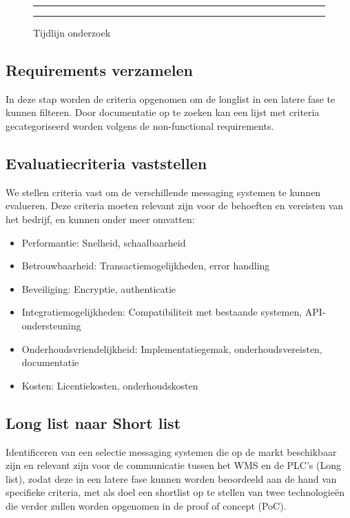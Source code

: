 \begin{figure}[htbp]
  \centering  
  \rule{\linewidth}{1pt}
  \rule{\linewidth}{1pt}
  \caption{Tijdlijn onderzoek}
  \label{fig:timeline}
\end{figure}

 
\subsection{Requirements verzamelen}
In deze stap worden de criteria opgenomen om de longlist in een latere fase te kunnen filteren.
Door documentatie op te zoeken kan een lijst met criteria gecategoriseerd worden volgens de non-functional requirements.

\subsection{Evaluatiecriteria vaststellen}
We stellen criteria vast om de verschillende messaging systemen te kunnen evalueren. 
Deze criteria moeten relevant zijn voor de behoeften en vereisten van het bedrijf, en kunnen onder meer omvatten:
\begin{itemize}
  \item Performantie: Snelheid, schaalbaarheid
  \item Betrouwbaarheid: Transactiemogelijkheden, error handling
  \item Beveiliging: Encryptie, authenticatie
  \item Integratiemogelijkheden: Compatibiliteit \newline met bestaande systemen, API-ondersteuning
  \item Onderhoudsvriendelijkheid: Implementatiegemak, onderhoudsvereisten, documentatie
  \item Kosten: Licentiekosten, onderhoudskosten
\end{itemize}

\subsection{Long list naar Short list}
Identificeren van een selectie messaging systemen die op de markt beschikbaar zijn en relevant zijn voor de communicatie tussen 
het WMS en de PLC's (Long list), zodat deze in een latere fase kunnen worden beoordeeld aan de hand van specifieke criteria, 
met als doel een shortlist op te stellen van twee technologieën die verder zullen worden opgenomen in de proof of concept (PoC).

